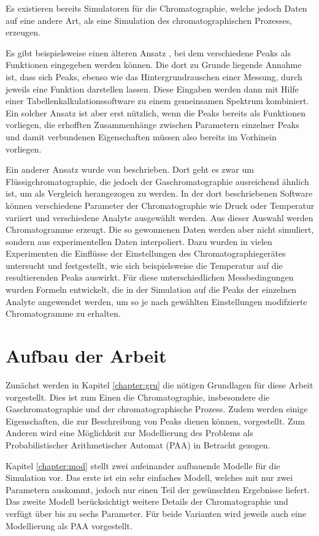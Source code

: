Es existieren bereits Simulatoren für die Chromatographie, welche jedoch Daten auf eine andere Art, als eine Simulation des chromatographischen Prozesses, erzeugen.

Es gibt beispielsweise einen älteren Ansatz \citep{spreadsheet}, bei dem verschiedene Peaks als Funktionen eingegeben werden können. Die dort zu Grunde liegende Annahme ist, dass sich Peaks, ebenso wie das Hintergrundrauschen einer Messung, durch jeweils eine Funktion darstellen lassen. Diese Eingaben werden dann mit Hilfe einer Tabellenkalkulationssoftware zu einem gemeinsamen Spektrum kombiniert. Ein solcher Ansatz ist aber erst nützlich, wenn die Peaks bereits als Funktionen vorliegen, die erhofften Zusammenhänge zwischen Parametern einzelner Peaks und damit verbundenen Eigenschaften müssen also bereits im Vorhinein vorliegen.

Ein anderer Ansatz wurde von \citet{hplcsim} beschrieben. Dort geht es zwar um Flüssigchromatographie, die jedoch der Gaschromatographie ausreichend ähnlich ist, um als Vergleich herangezogen zu werden. In der dort beschriebenen Software können verschiedene Parameter der Chromatographie wie Druck oder Temperatur variiert und verschiedene Analyte ausgewählt werden. Aus dieser Auswahl werden Chromatogramme erzeugt. Die so gewonnenen Daten werden aber nicht simuliert, sondern aus experimentellen Daten interpoliert. Dazu wurden in vielen Experimenten die Einflüsse der Einstellungen des Chromatographiegerätes untersucht und festgestellt, wie sich beispielsweise die Temperatur auf die resultierenden Peaks auswirkt. Für diese unterschiedlichen Messbedingungen wurden Formeln entwickelt, die in der Simulation auf die Peaks der einzelnen Analyte angewendet werden, um so je nach gewählten Einstellungen modifzierte Chromatogramme zu erhalten.


\section{Aufbau der Arbeit}
Zunächst werden in Kapitel \ref{chapter:gru} die nötigen Grundlagen für diese Arbeit vorgestellt. Dies ist zum Einen die Chromatographie, insbesondere die Gaschromatographie und der chromatographische Prozess. Zudem werden einige Eigenschaften, die zur Beschreibung von Peaks dienen können, vorgestellt. Zum Anderen wird eine Möglichkeit zur Modellierung des Problems als Probabilistischer Arithmetischer Automat (PAA) in Betracht gezogen.

Kapitel \ref{chapter:mod} stellt zwei aufeinander aufbauende Modelle für die Simulation vor. Das erste ist ein sehr einfaches Modell, welches mit nur zwei Parametern auskommt, jedoch nur einen Teil der gewünschten Ergebnisse liefert. Das zweite Modell berücksichtigt weitere Details der Chromatographie und verfügt über bis zu sechs Parameter. Für beide Varianten wird jeweils auch eine Modellierung als PAA vorgestellt.

